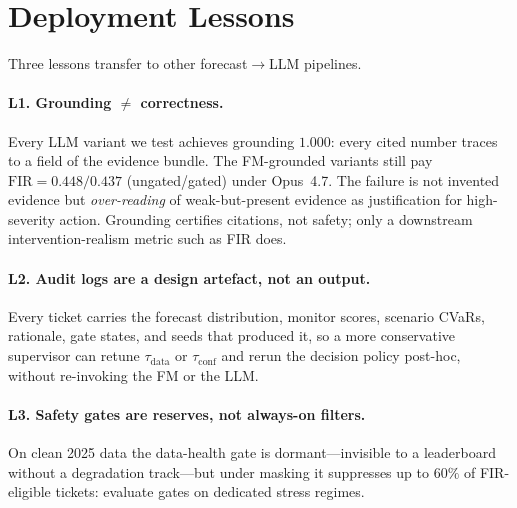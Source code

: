 \section{Deployment Lessons}
\label{sec:lessons}

Three lessons transfer to other forecast$\to$LLM pipelines.

\paragraph{L1. Grounding $\ne$ correctness.}
Every LLM variant we test achieves grounding $1.000$: every
cited number traces to a field of the evidence bundle. The
FM-grounded variants still pay
$\mathrm{FIR}\!=\!0.448/0.437$ (ungated/gated) under Opus~4.7. The
failure is not invented evidence but \emph{over-reading} of
weak-but-present evidence as justification for high-severity
action. Grounding certifies citations, not safety; only a
downstream intervention-realism metric such as FIR does.

\paragraph{L2. Audit logs are a design artefact, not an output.}
Every ticket carries the forecast distribution, monitor scores,
scenario CVaRs, rationale, gate states, and seeds that produced
it, so a more conservative supervisor can retune
$\tau_{\mathrm{data}}$ or $\tau_{\mathrm{conf}}$ and rerun the
decision policy post-hoc, without re-invoking the FM or the LLM.

\paragraph{L3. Safety gates are reserves, not always-on filters.}
On clean 2025 data the data-health gate is dormant---invisible to
a leaderboard without a degradation track---but under masking it
suppresses up to $60\%$ of FIR-eligible tickets: evaluate gates on
dedicated stress regimes.

